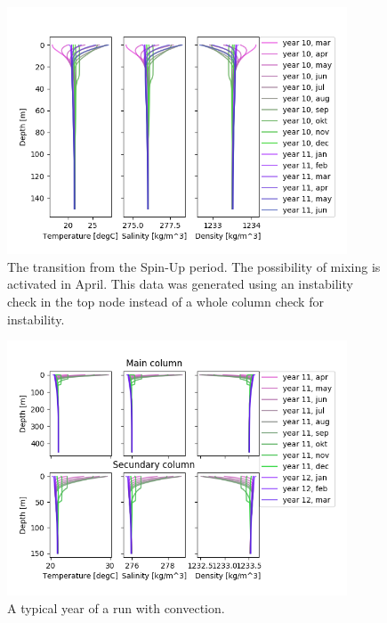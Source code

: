 \documentclass[twocolumn]{article}
\begin{document}
\begin{figure}
\centering
\includegraphics[width=0.9\textwidth,keepaspectratio]{Transition.png}
\caption{The transition from the Spin-Up period. The possibility of mixing is activated in April. This data was generated using an instability check in the top node instead of a whole column check for instability.}
\label{fig:Transition}
\end{figure}



\begin{figure}
\centering
\includegraphics[width=0.9\textwidth,keepaspectratio]{Conv_only.png}
\caption{A typical year of a run with convection.}
\label{fig:Conv_Only}
\end{figure}
\end{document}
